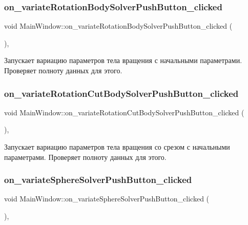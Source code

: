 \subsubsection{\texorpdfstring{on\+\_\+variate\+Rotation\+Body\+Solver\+Push\+Button\+\_\+clicked}{on\_variateRotationBodySolverPushButton\_clicked}}
{\footnotesize\ttfamily void Main\+Window\+::on\+\_\+variate\+Rotation\+Body\+Solver\+Push\+Button\+\_\+clicked (\begin{DoxyParamCaption}{ }\end{DoxyParamCaption})\hspace{0.3cm}{\ttfamily [private]}, {\ttfamily [slot]}}

Запускает вариацию параметров тела вращения с начальными параметрами. Проверяет полноту данных для этого. \mbox{\label{class_main_window_afda202c413199135427ca6a1b19587c5}} 
\subsubsection{\texorpdfstring{on\+\_\+variate\+Rotation\+Cut\+Body\+Solver\+Push\+Button\+\_\+clicked}{on\_variateRotationCutBodySolverPushButton\_clicked}}
{\footnotesize\ttfamily void Main\+Window\+::on\+\_\+variate\+Rotation\+Cut\+Body\+Solver\+Push\+Button\+\_\+clicked (\begin{DoxyParamCaption}{ }\end{DoxyParamCaption})\hspace{0.3cm}{\ttfamily [private]}, {\ttfamily [slot]}}

Запускает вариацию параметров тела вращения со срезом с начальными параметрами. Проверяет полноту данных для этого. \mbox{\label{class_main_window_a34d41c030a12cb9a8ddee74f19888501}} 
\subsubsection{\texorpdfstring{on\+\_\+variate\+Sphere\+Solver\+Push\+Button\+\_\+clicked}{on\_variateSphereSolverPushButton\_clicked}}
{\footnotesize\ttfamily void Main\+Window\+::on\+\_\+variate\+Sphere\+Solver\+Push\+Button\+\_\+clicked (\begin{DoxyParamCaption}{ }\end{DoxyParamCaption})\hspace{0.3cm}{\ttfamily [private]}, {\ttfamily [slot]}}

